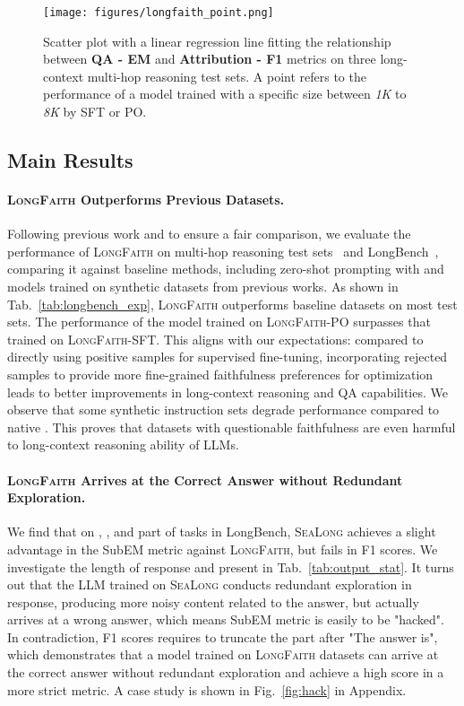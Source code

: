\begin{figure*}[t]
    \centering
    \centerline{\texttt{[image: figures/longfaith\_point.png]}}
    \caption{Scatter plot with a linear regression line fitting the relationship between \textbf{QA - EM} and \textbf{Attribution - F1} metrics on three long-context multi-hop reasoning test sets. A point refers to the performance of a model trained with a specific size between \textit{1K} to \textit{8K} by SFT or PO.}
    \label{fig:point}
    \vspace{-5pt}
\end{figure*}

\subsection{Main Results}  
\paragraph{\textsc{LongFaith} Outperforms Previous Datasets.} Following previous work and to ensure a fair comparison, we evaluate the performance of \textsc{LongFaith} on multi-hop reasoning test sets~\cite{musique, twowiki, hotpotqa} and LongBench~\cite{longbench}, comparing it against baseline methods, including zero-shot prompting with \llama and models trained on synthetic datasets from previous works. As shown in Tab.~\ref{tab:longbench_exp}, \textsc{LongFaith} outperforms baseline datasets on most test sets. The performance of the model trained on \textsc{LongFaith}-PO surpasses that trained on \textsc{LongFaith}-SFT. This aligns with our expectations: compared to directly using positive samples for supervised fine-tuning, incorporating rejected samples to provide more fine-grained faithfulness preferences for optimization leads to better improvements in long-context reasoning and QA capabilities. We observe that some synthetic instruction sets degrade performance compared to native \llama. This proves that datasets with questionable faithfulness are even harmful to long-context reasoning ability of LLMs.

\paragraph{\textsc{LongFaith} Arrives at the Correct Answer without Redundant Exploration.} We find that on \twowiki, \hotpot, and part of tasks in LongBench, \textsc{SeaLong} achieves a slight advantage in the SubEM metric against \textsc{LongFaith}, but fails in F1 scores. We investigate the length of response and present in Tab.~\ref{tab:output_stat}. It turns out that the LLM trained on \textsc{SeaLong} conducts redundant exploration in response, producing more noisy content related to the answer, but actually arrives at a wrong answer, which means SubEM metric is easily to be "hacked". In contradiction, F1 scores requires to truncate the part after "The answer is", which demonstrates that a model trained on \textsc{LongFaith} datasets can arrive at the correct answer without redundant exploration and achieve a high score in a more strict metric. A case study is shown in Fig.~\ref{fig:hack} in Appendix.

